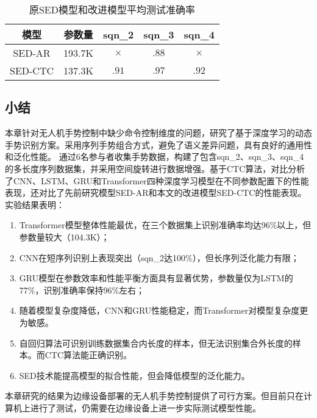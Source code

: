 \begin{table}
    \centering
        \caption{原SED模型和改进模型平均测试准确率}
    \begin{tabular}{ccccc}
        \hline
        模型 & 参数量 & sqn\_2 & sqn\_3 &sqn\_4\\
        \hline
        SED-AR & 193.7K & $\times$ & $.88$& $\times$\\
        SED-CTC & 137.3K  & $.91$& $.97$ & $.92$\\
        \hline
    \end{tabular}
    \label{tab:ch6-sed}
\end{table}

\subsection{小结}

本章针对无人机手势控制中缺少命令控制维度的问题，研究了基于深度学习的动态手势识别方案。采用序列手势组合方式，避免了语义差异问题，具有良好的通用性和泛化性能。
通过6名参与者收集手势数据，构建了包含sqn\_2、sqn\_3、sqn\_4的多长度序列数据集，并采用空间旋转进行数据增强。基于CTC算法，对比分析了CNN、LSTM、GRU和Transformer四种深度学习模型在不同参数配置下的性能表现，还对比了先前研究模型SED-AR和本文的改进模型SED-CTC的性能表现。
实验结果表明：
\begin{enumerate}
    \item Transformer模型整体性能最优，在三个数据集上识别准确率均达96\%以上，但参数量较大（104.3K）；
    \item CNN在短序列识别上表现突出（sqn\_2达100\%），但长序列泛化能力有限；
    \item GRU模型在参数效率和性能平衡方面具有显著优势，参数量仅为LSTM的77\%，识别准确率保持96\%左右；
    \item 随着模型复杂度降低，CNN和GRU性能稳定，而Transformer对模型复杂度更为敏感。
    \item 自回归算法可识别训练数据集合内长度的样本，但无法识别集合外长度的样本。而CTC算法能正确识别。
    \item SED技术能提高模型的拟合性能，但会降低模型的泛化能力。
\end{enumerate}

本章研究的结果为边缘设备部署的无人机手势控制提供了可行方案。但目前只在计算机上进行了测试，仍需要在边缘设备上进一步实际测试模型性能。

\ifx\allfiles\undefined

\fi
